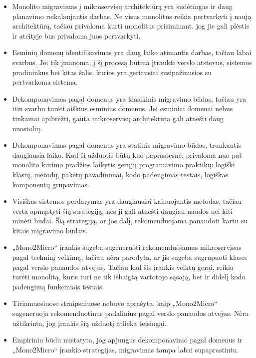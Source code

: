\documentclass[fleqn]{VUMIFPSkursinis}
\begin{document}
\begin{itemize}
    \item Monolito migravimas į mikroservisų architektūrą yra sudėtingas ir daug planavimo reikalaujantis darbas. Ne visus monolitus reikia pertvarkyti į naują architektūrą, tačiau privaloma kurti monolitus prisiminant, jog jie gali plėstis ir ateityje bus privaloma juos pertvarkyti.
    
    \item Esminių domenų identifikavimas yra daug laiko atimantis darbas, tačiau labai svarbus. Jei tik įmanoma, į šį procesą būtina įtraukti verslo atstovus, sistemos pradininkus bei kitas šalis, kurios yra geriausiai susipažinusios su pertvarkoma sistema.
    
    \item Dekomponavimas pagal domenus yra klasikinis migravimo būdas, tačiau yra itin svarbu turėti aiškius esminius domenus. Jei esminiai domenai nebus tinkamai apibrėžti, gauta mikroservisų architektūra gali atnešti daug nuostolių.
    
    \item Dekomponavimas pagal domenus yra statinis migravimo būdas, trunkantis daugiausia laiko. Kad ši užduotis būtų kuo paprastesnė, privaloma nuo pat monolito kūrimo pradžios laikytis gerųjų programavimo praktikų: logiški klasių, metodų, paketų pavadinimai, kodo padengimas testais, logiškas komponentų grupavimas.
    
    \item Visiškas sistemos perdarymas yra daugiausiai kainuojantis metodas, tačiau verta apmąstyti šią strategiją, nes ji gali atnešti daugiau naudos nei kiti minėti būdai. Šią strategiją, ar jos dalį, rekomenduojama panaudoti kartu su kitais migravimo būdais.
    
    \item „Mono2Micro“ įrankis sugeba sugeneruoti rekomenduojamus mikroservisus pagal techninį veikimą, tačiau  nėra parodyta, ar jis sugeba sugrupuoti klases pagal verslo panaudos atvejus. Tačiau kad šis įrankis veiktų gerai, reikia turėti monolitą, kuris turi ne tik išbaigtą vartotojo sąsają, bet ir didelį kodo padengimą funkciniais testais.
        
    \item Tiriamuosiuose straipsniuose nebuvo aprašyta, kaip „Mono2Micro“ sugeneruoja rekomenduotinus padalinius pagal verslo panaudos atvejus. Nėra užtikrinta, jog įrankis šią užduotį atlieka teisingai.
    
    \item Empiriniu būdu nustatyta, jog apjungus dekomponavimo pagal domenus ir „Mono2Micro“ įrankio strategijas, migravimas tampa labai supaprastintu.


\end{itemize}
\end{document}
